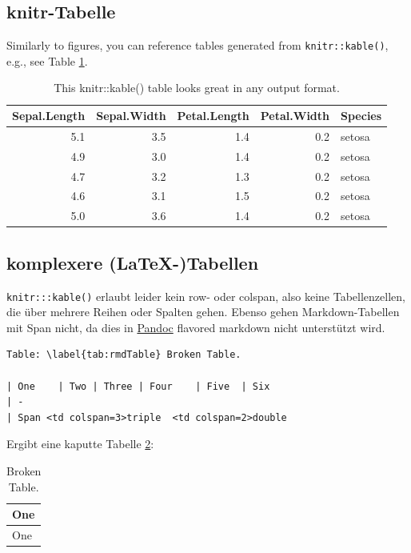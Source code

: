 \documentclass[]{book}
\theoremstyle{definition}
\theoremstyle{definition}
\theoremstyle{remark}
\begin{document}
\subsection{knitr-Tabelle}\label{knitr-tabelle}

Similarly to figures, you can reference tables generated from
\texttt{knitr::kable()}, e.g., see Table \ref{tab:knitrTable}.

\begin{table}

\caption{\label{tab:knitrTable}This knitr::kable() table looks great in any output format.}
\centering
\begin{tabular}[t]{rrrrl}
\toprule
Sepal.Length & Sepal.Width & Petal.Length & Petal.Width & Species\\
\midrule
5.1 & 3.5 & 1.4 & 0.2 & setosa\\
4.9 & 3.0 & 1.4 & 0.2 & setosa\\
4.7 & 3.2 & 1.3 & 0.2 & setosa\\
4.6 & 3.1 & 1.5 & 0.2 & setosa\\
5.0 & 3.6 & 1.4 & 0.2 & setosa\\
\bottomrule
\end{tabular}
\end{table}

\subsection{komplexere (LaTeX-)Tabellen}\label{complexTables}

\texttt{knitr:::kable()} erlaubt leider kein row- oder colspan, also
keine Tabellenzellen, die über mehrere Reihen oder Spalten gehen. Ebenso
gehen Markdown-Tabellen mit Span nicht, da dies in
\href{http://www.pandoc.org/MANUAL.html\#tables}{Pandoc} flavored
markdown nicht unterstützt wird.

\begin{verbatim}
Table: \label{tab:rmdTable} Broken Table.

| One    | Two | Three | Four    | Five  | Six 
| -
| Span <td colspan=3>triple  <td colspan=2>double
\end{verbatim}

Ergibt eine kaputte Tabelle \ref{tab:rmdTable}:

\begin{longtable}[]{@{}l@{}}
\caption{\label{tab:rmdTable}Broken Table.}\tabularnewline
\toprule
One\tabularnewline
\midrule
\endfirsthead
\toprule
One\tabularnewline
\midrule
\endhead
\bottomrule
\end{longtable}
\end{document}

